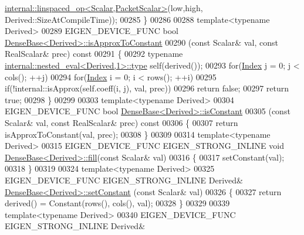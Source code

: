 \begin{DoxyCode}
      \hyperlink{struct_eigen_1_1internal_1_1linspaced__op}{internal::linspaced\_op<Scalar,PacketScalar>}(low,high,
      Derived::SizeAtCompileTime));
00285 \}
00286 
00288 \textcolor{keyword}{template}<\textcolor{keyword}{typename} Derived>
00289 EIGEN\_DEVICE\_FUNC \textcolor{keywordtype}{bool} \hyperlink{group___core___module_aafb86c9868d3d9076e01e4fc54c93e81}{DenseBase<Derived>::isApproxToConstant}
00290 (\textcolor{keyword}{const} Scalar& val, \textcolor{keyword}{const} RealScalar& prec)\textcolor{keyword}{ const}
00291 \textcolor{keyword}{}\{
00292   \textcolor{keyword}{typename} \hyperlink{class_eigen_1_1internal_1_1_tensor_lazy_evaluator_writable}{internal::nested\_eval<Derived,1>::type} \textcolor{keyword}{self}(derived());
00293   \textcolor{keywordflow}{for}(\hyperlink{namespace_eigen_a62e77e0933482dafde8fe197d9a2cfde}{Index} j = 0; j < cols(); ++j)
00294     \textcolor{keywordflow}{for}(\hyperlink{namespace_eigen_a62e77e0933482dafde8fe197d9a2cfde}{Index} i = 0; i < rows(); ++i)
00295       \textcolor{keywordflow}{if}(!internal::isApprox(\textcolor{keyword}{self}.coeff(i, j), val, prec))
00296         \textcolor{keywordflow}{return} \textcolor{keyword}{false};
00297   \textcolor{keywordflow}{return} \textcolor{keyword}{true};
00298 \}
00299 
00303 \textcolor{keyword}{template}<\textcolor{keyword}{typename} Derived>
00304 EIGEN\_DEVICE\_FUNC \textcolor{keywordtype}{bool} \hyperlink{group___core___module_aba0e5df04cf80214d8298aa8dd41acbd}{DenseBase<Derived>::isConstant}
00305 (\textcolor{keyword}{const} Scalar& val, \textcolor{keyword}{const} RealScalar& prec)\textcolor{keyword}{ const}
00306 \textcolor{keyword}{}\{
00307   \textcolor{keywordflow}{return} isApproxToConstant(val, prec);
00308 \}
00309 
00314 \textcolor{keyword}{template}<\textcolor{keyword}{typename} Derived>
00315 EIGEN\_DEVICE\_FUNC EIGEN\_STRONG\_INLINE \textcolor{keywordtype}{void} \hyperlink{group___core___module_a4f5eb49e80db57f79a8353ecdf811418}{DenseBase<Derived>::fill}(\textcolor{keyword}{const} Scalar& 
      val)
00316 \{
00317   setConstant(val);
00318 \}
00319 
00324 \textcolor{keyword}{template}<\textcolor{keyword}{typename} Derived>
00325 EIGEN\_DEVICE\_FUNC EIGEN\_STRONG\_INLINE Derived& \hyperlink{group___core___module_a19b2bc788277e9ab3f967a8857e290ae}{DenseBase<Derived>::setConstant}
      (\textcolor{keyword}{const} Scalar& val)
00326 \{
00327   \textcolor{keywordflow}{return} derived() = Constant(rows(), cols(), val);
00328 \}
00329 
00339 \textcolor{keyword}{template}<\textcolor{keyword}{typename} Derived>
00340 EIGEN\_DEVICE\_FUNC EIGEN\_STRONG\_INLINE Derived&

\end{DoxyCode}
